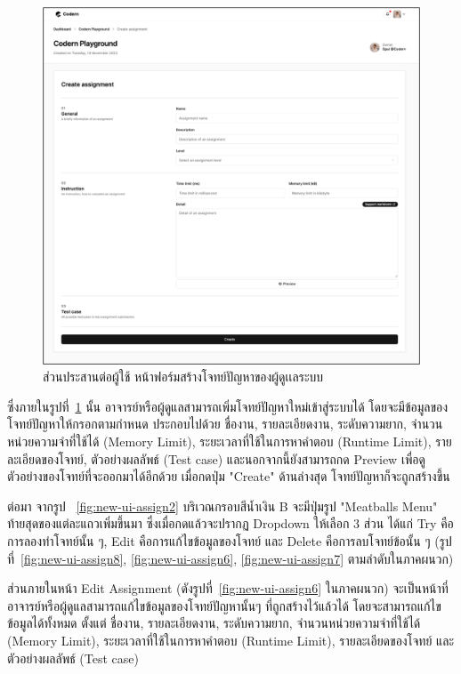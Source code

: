 \documentclass[12pt,one side,openright,a4paper]{cpe-thesis-th}
\newcommand{\thaijustify}[1]{%
  \par\hspace{30pt}\justifying
  #1
}
\begin{document}
\begin{figure}[H]
  \centering
  \includegraphics[width=15cm]{figure/new-ui/ui-assign5.png}
  \caption[ส่วนประสานต่อผู้ใช้ หน้าฟอร์มสร้างโจทย์ปัญหา]{ส่วนประสานต่อผู้ใช้ หน้าฟอร์มสร้างโจทย์ปัญหาของผู้ดูเเลระบบ}
  \label{fig:new-ui-assign5}
\end{figure}
\thaijustify{
  ซึ่งภายในรูปที่~\ref{fig:new-ui-assign5} นั้น อาจารย์หรือผู้ดูแลสามารถเพิ่มโจทย์ปัญหาใหม่เข้าสู่ระบบได้ โดยจะมีข้อมูลของโจทย์ปัญหาให้กรอกตามกำหนด ประกอบไปด้วย ชื่องาน, รายละเอียดงาน, ระดับความยาก, จำนวนหน่วยความจำที่ใช้ได้ (Memory Limit), ระยะเวลาที่ใช้ในการหาคำตอบ (Runtime Limit), รายละเอียดของโจทย์, ตัวอย่างผลลัพธ์ (Test case) และนอกจากนี้ยังสามารถกด Preview เพื่อดูตัวอย่างของโจทย์ที่จะออกมาได้อีกด้วย เมื่อกดปุ่ม "Create" ด้านล่างสุด โจทย์ปัญหาก็จะถูกสร้างขึ้น
}
\thaijustify{
  ต่อมา จากรูป ~\ref{fig:new-ui-assign2} บริเวณกรอบสีน้ำเงิน B จะมีปุ่มรูป "Meatballs Menu" ท้ายสุดของแต่ละแถวเพิ่มขึ้นมา ซึ่งเมื่อกดแล้วจะปรากฏ Dropdown ให้เลือก 3 ส่วน ได้แก่ Try คือการลองทำโจทย์นั้น ๆ, Edit คือการแก้ไขข้อมูลของโจทย์ และ Delete คือการลบโจทย์ข้อนั้น ๆ (รูปที่~\ref{fig:new-ui-assign8},  \ref{fig:new-ui-assign6}, \ref{fig:new-ui-assign7} ตามลำดับในภาคผนวก)
}
\thaijustify{
  ส่วนภายในหน้า Edit Assignment (ดังรูปที่~\ref{fig:new-ui-assign6} ในภาคผนวก) จะเป็นหน้าที่อาจารย์หรือผู้ดูแลสามารถแก้ไขข้อมูลของโจทย์ปัญหานั้นๆ ที่ถูกสร้างไว้แล้วได้ โดยจะสามารถแก้ไขข้อมูลได้ทั้งหมด ตั้งแต่ ชื่องาน, รายละเอียดงาน, ระดับความยาก, จำนวนหน่วยความจำที่ใช้ได้ (Memory Limit), ระยะเวลาที่ใช้ในการหาคำตอบ (Runtime Limit), รายละเอียดของโจทย์ และตัวอย่างผลลัพธ์ (Test case)
}
\end{document}
